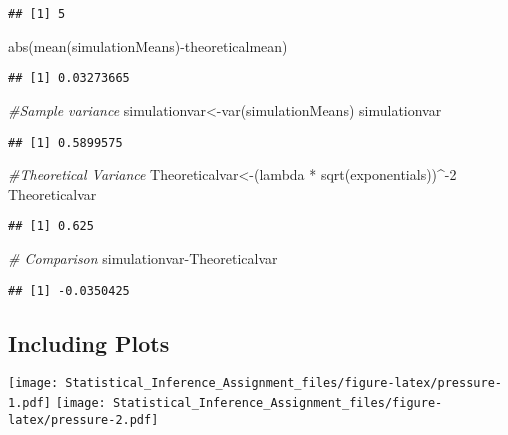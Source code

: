 \documentclass[
]{article}
\newenvironment{Shaded}{\begin{snugshade}}{\end{snugshade}}
\newcommand{\CommentTok}[1]{\textcolor[rgb]{0.56,0.35,0.01}{\textit{#1}}}
\newcommand{\DecValTok}[1]{\textcolor[rgb]{0.00,0.00,0.81}{#1}}
\newcommand{\FunctionTok}[1]{\textcolor[rgb]{0.00,0.00,0.00}{#1}}
\newcommand{\NormalTok}[1]{#1}
\newcommand{\OtherTok}[1]{\textcolor[rgb]{0.56,0.35,0.01}{#1}}
\newcommand{\SpecialCharTok}[1]{\textcolor[rgb]{0.00,0.00,0.00}{#1}}
\begin{document}
\begin{verbatim}
## [1] 5
\end{verbatim}

\begin{Shaded}
\begin{Highlighting}[]
\FunctionTok{abs}\NormalTok{(}\FunctionTok{mean}\NormalTok{(simulationMeans)}\SpecialCharTok{{-}}\NormalTok{theoreticalmean)}
\end{Highlighting}
\end{Shaded}

\begin{verbatim}
## [1] 0.03273665
\end{verbatim}

\begin{Shaded}
\begin{Highlighting}[]
\CommentTok{\#Sample variance}
\NormalTok{simulationvar}\OtherTok{\textless{}{-}}\FunctionTok{var}\NormalTok{(simulationMeans)}
\NormalTok{simulationvar}
\end{Highlighting}
\end{Shaded}

\begin{verbatim}
## [1] 0.5899575
\end{verbatim}

\begin{Shaded}
\begin{Highlighting}[]
\CommentTok{\#Theoretical Variance}
\NormalTok{Theoreticalvar}\OtherTok{\textless{}{-}}\NormalTok{(lambda }\SpecialCharTok{*} \FunctionTok{sqrt}\NormalTok{(exponentials))}\SpecialCharTok{\^{}{-}}\DecValTok{2}
\NormalTok{Theoreticalvar}
\end{Highlighting}
\end{Shaded}

\begin{verbatim}
## [1] 0.625
\end{verbatim}

\begin{Shaded}
\begin{Highlighting}[]
\CommentTok{\# Comparison }
\NormalTok{simulationvar}\SpecialCharTok{{-}}\NormalTok{Theoreticalvar}
\end{Highlighting}
\end{Shaded}

\begin{verbatim}
## [1] -0.0350425
\end{verbatim}

\hypertarget{including-plots}{%
\subsection{Including Plots}\label{including-plots}}

\texttt{[image: Statistical\_Inference\_Assignment\_files/figure-latex/pressure-1.pdf]}
\texttt{[image: Statistical\_Inference\_Assignment\_files/figure-latex/pressure-2.pdf]}
\end{document}
